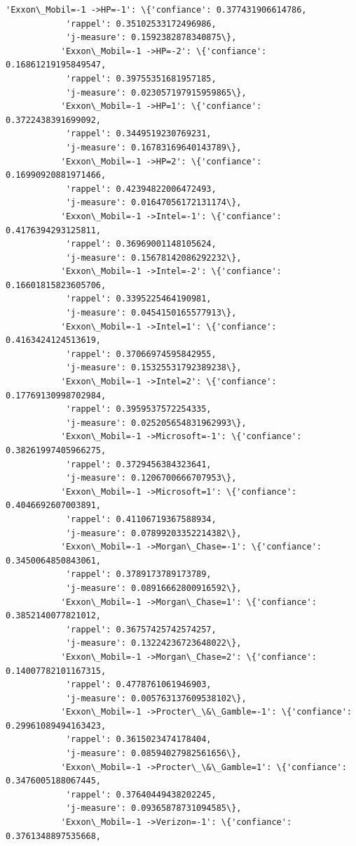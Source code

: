 \documentclass[11pt]{article}
\begin{document}
\begin{Verbatim}[commandchars=\\\{\}]
           'Exxon\_Mobil=-1 ->HP=-1': \{'confiance': 0.377431906614786,
            'rappel': 0.35102533172496986,
            'j-measure': 0.1592382878340875\},
           'Exxon\_Mobil=-1 ->HP=-2': \{'confiance': 0.16861219195849547,
            'rappel': 0.39755351681957185,
            'j-measure': 0.023057197915959865\},
           'Exxon\_Mobil=-1 ->HP=1': \{'confiance': 0.3722438391699092,
            'rappel': 0.3449519230769231,
            'j-measure': 0.16783169640143789\},
           'Exxon\_Mobil=-1 ->HP=2': \{'confiance': 0.16990920881971466,
            'rappel': 0.42394822006472493,
            'j-measure': 0.01647056172131174\},
           'Exxon\_Mobil=-1 ->Intel=-1': \{'confiance': 0.4176394293125811,
            'rappel': 0.36969001148105624,
            'j-measure': 0.15678142086292232\},
           'Exxon\_Mobil=-1 ->Intel=-2': \{'confiance': 0.16601815823605706,
            'rappel': 0.3395225464190981,
            'j-measure': 0.0454150165577913\},
           'Exxon\_Mobil=-1 ->Intel=1': \{'confiance': 0.4163424124513619,
            'rappel': 0.37066974595842955,
            'j-measure': 0.15325531792389238\},
           'Exxon\_Mobil=-1 ->Intel=2': \{'confiance': 0.17769130998702984,
            'rappel': 0.3959537572254335,
            'j-measure': 0.025205654831962993\},
           'Exxon\_Mobil=-1 ->Microsoft=-1': \{'confiance': 0.38261997405966275,
            'rappel': 0.3729456384323641,
            'j-measure': 0.1206700666707953\},
           'Exxon\_Mobil=-1 ->Microsoft=1': \{'confiance': 0.4046692607003891,
            'rappel': 0.41106719367588934,
            'j-measure': 0.07899203352214382\},
           'Exxon\_Mobil=-1 ->Morgan\_Chase=-1': \{'confiance': 0.3450064850843061,
            'rappel': 0.3789173789173789,
            'j-measure': 0.08916662800916592\},
           'Exxon\_Mobil=-1 ->Morgan\_Chase=1': \{'confiance': 0.3852140077821012,
            'rappel': 0.36757425742574257,
            'j-measure': 0.13224236723648022\},
           'Exxon\_Mobil=-1 ->Morgan\_Chase=2': \{'confiance': 0.14007782101167315,
            'rappel': 0.4778761061946903,
            'j-measure': 0.005763137609538102\},
           'Exxon\_Mobil=-1 ->Procter\_\&\_Gamble=-1': \{'confiance': 0.29961089494163423,
            'rappel': 0.3615023474178404,
            'j-measure': 0.08594027982561656\},
           'Exxon\_Mobil=-1 ->Procter\_\&\_Gamble=1': \{'confiance': 0.3476005188067445,
            'rappel': 0.37640449438202245,
            'j-measure': 0.09365878731094585\},
           'Exxon\_Mobil=-1 ->Verizon=-1': \{'confiance': 0.3761348897535668,

\end{Verbatim}
\end{document}
